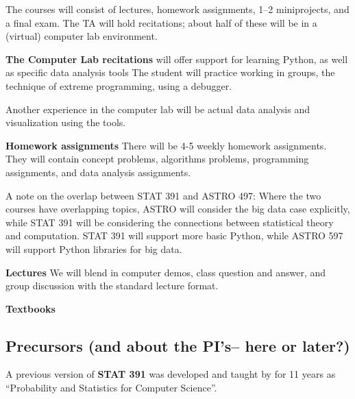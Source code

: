 The courses will consist of lectures, homework assignments, 1--2
miniprojects, and a final exam. The TA will hold recitations; about
half of these will be in a (virtual) computer lab environment. 

{\bf The Computer Lab recitations} will offer support for learning Python, as well as specific data analysis tools    The student will practice working in groups, the technique of extreme programming, using a debugger.

Another experience in the computer lab will be actual data analysis and visualization using the tools. 


{\bf Homework assignments} There will be 4-5 weekly homework assignments. They will contain concept problems, algorithms problems, programming assignments, and data analysis assignments.



A note on the overlap between STAT 391 and ASTRO 497: Where the two
courses have overlapping topics, ASTRO will consider the big data case
explicitly, while STAT 391 will be considering the connections between
statistical theory and computation. STAT 391 will support more basic
Python, while ASTRO 597 will support Python libraries for big data.

{\bf Lectures} We will blend in computer demos, class question and answer, and group discussion with the standard lecture format. 

{\bf Textbooks} 




\subsection{Precursors (and about the PI's-- here or later?)}
\label{sec:precursors}

A previous version of {\bf STAT 391} was developed and taught by \meila for 11 years as ``Probability and Statistics for Computer Science''.

